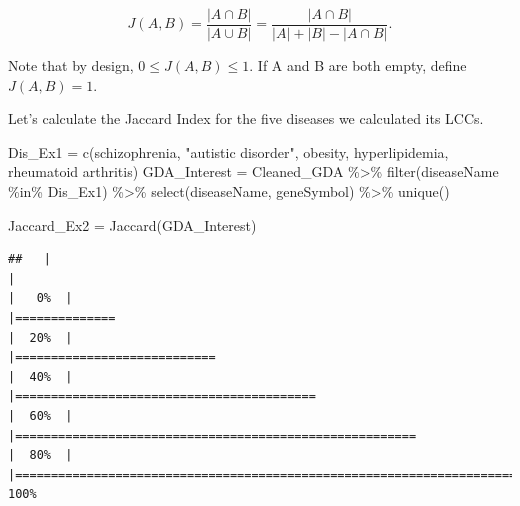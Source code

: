 \documentclass[
]{book}
\newenvironment{Shaded}{\begin{snugshade}}{\end{snugshade}}
\newcommand{\FunctionTok}[1]{\textcolor[rgb]{0.00,0.00,0.00}{#1}}
\newcommand{\NormalTok}[1]{#1}
\newcommand{\OtherTok}[1]{\textcolor[rgb]{0.56,0.35,0.01}{#1}}
\newcommand{\SpecialCharTok}[1]{\textcolor[rgb]{0.00,0.00,0.00}{#1}}
\newcommand{\StringTok}[1]{\textcolor[rgb]{0.31,0.60,0.02}{#1}}
\begin{document}
\[
J(A,B) = \frac{|A \cap B|}{|A \cup B|} = \frac{|A \cap B|}{|A| + |B| - |A \cap B|}.
\]

Note that by design, \(0 \leq J(A,B) \leq 1\). If A and B are both empty, define \(J(A,B) = 1\).

Let's calculate the Jaccard Index for the five diseases we calculated its LCCs.

\begin{Shaded}
\begin{Highlighting}[]
\NormalTok{Dis\_Ex1 }\OtherTok{=} \FunctionTok{c}\NormalTok{(}\StringTok{\textquotesingle{}schizophrenia\textquotesingle{}}\NormalTok{,}
            \StringTok{"autistic disorder"}\NormalTok{, }
            \StringTok{\textquotesingle{}obesity\textquotesingle{}}\NormalTok{,}
            \StringTok{\textquotesingle{}hyperlipidemia\textquotesingle{}}\NormalTok{,}
            \StringTok{\textquotesingle{}rheumatoid arthritis\textquotesingle{}}\NormalTok{)}
\NormalTok{GDA\_Interest }\OtherTok{=}\NormalTok{ Cleaned\_GDA }\SpecialCharTok{\%\textgreater{}\%} 
  \FunctionTok{filter}\NormalTok{(diseaseName }\SpecialCharTok{\%in\%}\NormalTok{ Dis\_Ex1) }\SpecialCharTok{\%\textgreater{}\%}
  \FunctionTok{select}\NormalTok{(diseaseName, geneSymbol) }\SpecialCharTok{\%\textgreater{}\%}
  \FunctionTok{unique}\NormalTok{()}

\NormalTok{Jaccard\_Ex2 }\OtherTok{=} \FunctionTok{Jaccard}\NormalTok{(GDA\_Interest)}
\end{Highlighting}
\end{Shaded}

\begin{verbatim}
##   |                                                                              |                                                                      |   0%  |                                                                              |==============                                                        |  20%  |                                                                              |============================                                          |  40%  |                                                                              |==========================================                            |  60%  |                                                                              |========================================================              |  80%  |                                                                              |======================================================================| 100%
\end{verbatim}
\end{document}
